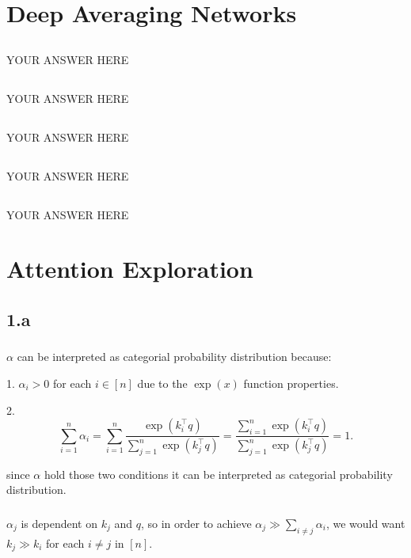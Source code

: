 \documentclass{article}
\begin{document}
\section{Deep Averaging Networks}
\subsection{}
YOUR ANSWER HERE
\subsection{}
YOUR ANSWER HERE
\subsection{}
YOUR ANSWER HERE
\subsection{}
YOUR ANSWER HERE
\subsection{}
YOUR ANSWER HERE

\section{Attention Exploration}
\subsection{1.a}
\subsubsection{}
\(\alpha\) can be interpreted as categorial probability distribution because:

1. \(\alpha_i > 0\) for each \(i \in [n]\) due to the \(\exp(x)\) function properties.

2. \[
\sum_{i=1}^n \alpha_i = \sum_{i=1}^n \frac{\exp(k_i^\top q)}{\sum_{j=1}^n \exp(k_j^\top q)} = 
\frac{\sum_{i=1}^n \exp(k_i^\top q)}{\sum_{j=1}^n \exp(k_j^\top q)} = 1.
\]

since \(\alpha\) hold those two conditions it can be interpreted as categorial probability distribution.

\subsubsection{}
\(\alpha_j\) is dependent on \(k_j\) and \(q\), so in order to achieve \(\alpha_j \gg \sum_{i \neq j} \alpha_i\), we would want \(k_j \gg k_i\) for each \(i \neq j\) in \([n]\).
\end{document}
